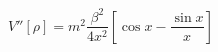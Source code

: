 \begin{equation}
V''[\rho] = m^2 \frac{\beta^2}{4 x^2} \left[ \cos x - \frac{\sin x}{x}     \right]
\end{equation}

